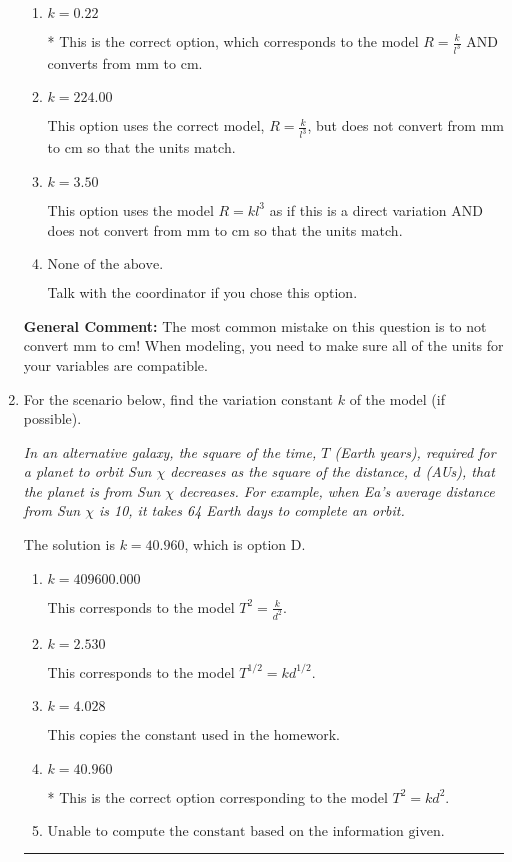 \documentclass{extbook}[14pt]
\newcommand{\litem}[1]{\item #1

\rule{\textwidth}{0.4pt}}
\begin{document}
\begin{enumerate}
{\begin{enumerate}[label=\Alph*.]
This option uses the model $R = kl^{3}$ as if this is a direct variation.
\item \( k = 0.22 \)

* This is the correct option, which corresponds to the model $R = \frac{k}{l^{3}}$ AND converts from mm to cm.
\item \( k = 224.00 \)

This option uses the correct model, $R = \frac{k}{l^{3}}$, but does not convert from mm to cm so that the units match.
\item \( k = 3.50 \)

This option uses the model $R = kl^{3}$ as if this is a direct variation AND does not convert from mm to cm so that the units match.
\item \( \text{None of the above.} \)

Talk with the coordinator if you chose this option.
\end{enumerate}

\textbf{General Comment:} The most common mistake on this question is to not convert mm to cm! When modeling, you need to make sure all of the units for your variables are compatible.
}
\litem{
For the scenario below, find the variation constant $k$ of the model (if possible).

\begin{center}
    \textit{ In an alternative galaxy, the square of the time, $T$ (Earth years), required for a planet to orbit Sun $\chi$ decreases as the square of the distance, $d$ (AUs), that the planet is from Sun $\chi$ decreases. For example, when Ea's average distance from Sun $\chi$ is 10, it takes 64 Earth days to complete an orbit. }
\end{center}
The solution is \( k = 40.960 \), which is option D.\begin{enumerate}[label=\Alph*.]
\item \( k = 409600.000 \)

This corresponds to the model $T^{2} = \frac{k}{d^{2}}$.
\item \( k = 2.530 \)

This corresponds to the model $T^{1/2} = k d^{1/2}$.
\item \( k = 4.028 \)

This copies the constant used in the homework.
\item \( k = 40.960 \)

* This is the correct option corresponding to the model $T^{2} = k d^{2}$.
\item \( \text{Unable to compute the constant based on the information given.} \)


\end{enumerate}}
\end{enumerate}
\end{document}
